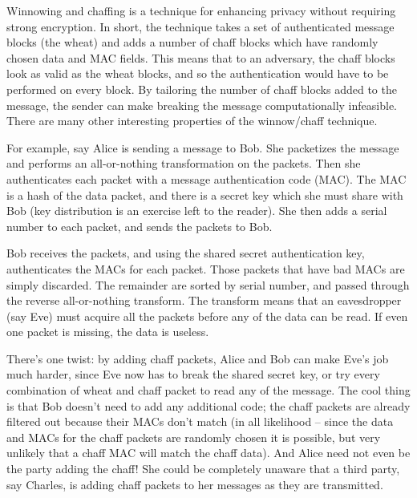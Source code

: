 \documentclass{howto}
\begin{document}
Winnowing and chaffing is a technique for enhancing privacy without requiring
strong encryption.  In short, the technique takes a set of authenticated
message blocks (the wheat) and adds a number of chaff blocks which have
randomly chosen data and MAC fields.  This means that to an adversary, the
chaff blocks look as valid as the wheat blocks, and so the authentication
would have to be performed on every block.  By tailoring the number of chaff
blocks added to the message, the sender can make breaking the message
computationally infeasible.  There are many other interesting properties of
the winnow/chaff technique.

For example, say Alice is sending a message to Bob.  She packetizes the
message and performs an all-or-nothing transformation on the packets.  Then
she authenticates each packet with a message authentication code (MAC).  The
MAC is a hash of the data packet, and there is a secret key which she must
share with Bob (key distribution is an exercise left to the reader).  She then
adds a serial number to each packet, and sends the packets to Bob.

Bob receives the packets, and using the shared secret authentication key,
authenticates the MACs for each packet.  Those packets that have bad MACs are
simply discarded.  The remainder are sorted by serial number, and passed
through the reverse all-or-nothing transform.  The transform means that an
eavesdropper (say Eve) must acquire all the packets before any of the data can
be read.  If even one packet is missing, the data is useless.

There's one twist: by adding chaff packets, Alice and Bob can make Eve's job
much harder, since Eve now has to break the shared secret key, or try every
combination of wheat and chaff packet to read any of the message.  The cool
thing is that Bob doesn't need to add any additional code; the chaff packets
are already filtered out because their MACs don't match (in all likelihood --
since the data and MACs for the chaff packets are randomly chosen it is
possible, but very unlikely that a chaff MAC will match the chaff data).  And
Alice need not even be the party adding the chaff!  She could be completely
unaware that a third party, say Charles, is adding chaff packets to her
messages as they are transmitted.
\end{document}
